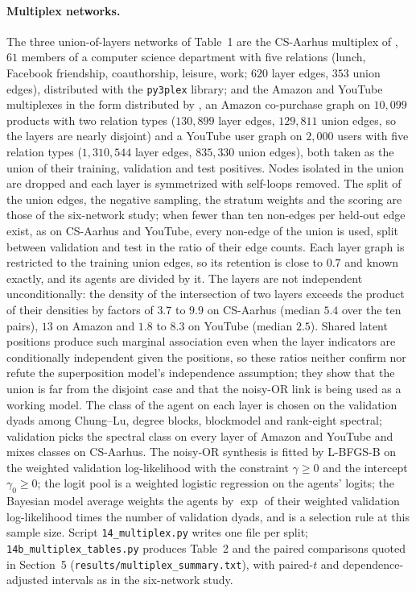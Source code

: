 \documentclass[12pt]{article}
\begin{document}
\paragraph{Multiplex networks.}
The three union-of-layers networks of Table~1 are the CS-Aarhus multiplex of \citet{MagnaniEtAl2013}, $61$ members of a computer science department with five relations (lunch, Facebook friendship, coauthorship, leisure, work; $620$ layer edges, $353$ union edges), distributed with the \texttt{py3plex} library; and the Amazon and YouTube multiplexes in the form distributed by \citet{CenEtAl2019}, an Amazon co-purchase graph on $10{,}099$ products with two relation types ($130{,}899$ layer edges, $129{,}811$ union edges, so the layers are nearly disjoint) and a YouTube user graph on $2{,}000$ users with five relation types ($1{,}310{,}544$ layer edges, $835{,}330$ union edges), both taken as the union of their training, validation and test positives. Nodes isolated in the union are dropped and each layer is symmetrized with self-loops removed. The split of the union edges, the negative sampling, the stratum weights and the scoring are those of the six-network study; when fewer than ten non-edges per held-out edge exist, as on CS-Aarhus and YouTube, every non-edge of the union is used, split between validation and test in the ratio of their edge counts. Each layer graph is restricted to the training union edges, so its retention is close to $0.7$ and known exactly, and its agents are divided by it. The layers are not independent unconditionally: the density of the intersection of two layers exceeds the product of their densities by factors of $3.7$ to $9.9$ on CS-Aarhus (median $5.4$ over the ten pairs), $13$ on Amazon and $1.8$ to $8.3$ on YouTube (median $2.5$). Shared latent positions produce such marginal association even when the layer indicators are conditionally independent given the positions, so these ratios neither confirm nor refute the superposition model's independence assumption; they show that the union is far from the disjoint case and that the noisy-OR link is being used as a working model. The class of the agent on each layer is chosen on the validation dyads among Chung--Lu, degree blocks, blockmodel and rank-eight spectral; validation picks the spectral class on every layer of Amazon and YouTube and mixes classes on CS-Aarhus. The noisy-OR synthesis is fitted by L-BFGS-B on the weighted validation log-likelihood with the constraint $\gamma\ge0$ and the intercept $\gamma_0\ge0$; the logit pool is a weighted logistic regression on the agents' logits; the Bayesian model average weights the agents by $\exp$ of their weighted validation log-likelihood times the number of validation dyads, and is a selection rule at this sample size. Script \texttt{14\_multiplex.py} writes one file per split; \texttt{14b\_multiplex\_tables.py} produces Table~2 and the paired comparisons quoted in Section~5 (\texttt{results/multiplex\_summary.txt}), with paired-$t$ and dependence-adjusted intervals as in the six-network study.
\end{document}
